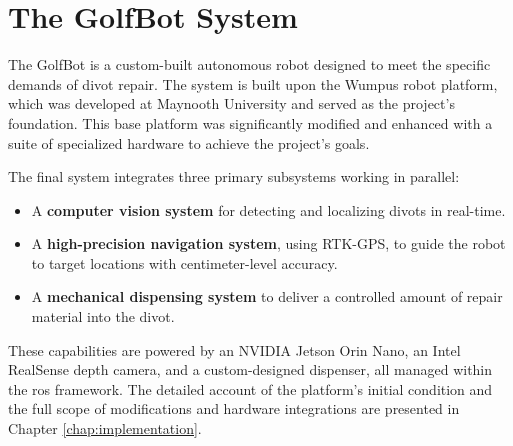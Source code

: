 \section{The GolfBot System}
\label{sec:golfbot_system}

The GolfBot is a custom-built autonomous robot designed to meet the specific demands of divot repair. The system is built upon the Wumpus robot platform, which was developed at Maynooth University and served as the project's foundation. This base platform was significantly modified and enhanced with a suite of specialized hardware to achieve the project's goals.

The final system integrates three primary subsystems working in parallel:
\begin{itemize}
    \item A \textbf{computer vision system} for detecting and localizing divots in real-time.
    \item A \textbf{high-precision navigation system}, using RTK-GPS, to guide the robot to target locations with centimeter-level accuracy.
    \item A \textbf{mechanical dispensing system} to deliver a controlled amount of repair material into the divot.
\end{itemize}
These capabilities are powered by an NVIDIA Jetson Orin Nano, an Intel RealSense depth camera, and a custom-designed dispenser, all managed within the \gls{ros} framework. The detailed account of the platform's initial condition and the full scope of modifications and hardware integrations are presented in Chapter \ref{chap:implementation}.


